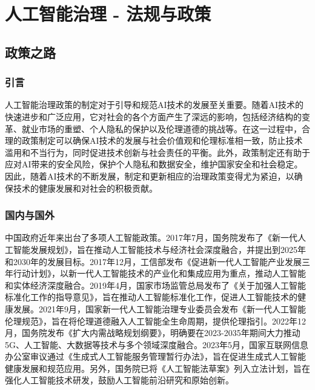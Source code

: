 \setchapterpreamble[u]{\margintoc}
\chapter[人工智能治理 - 法规与政策]{人工智能治理 - 法规与政策\footnotemark[0]}

{}

\section{政策之路}
\subsection{引言}
人工智能治理政策的制定对于引导和规范AI技术的发展至关重要。随着AI技术的快速进步和广泛应用，它对社会的各个方面产生了深远的影响，包括经济结构的变革、就业市场的重塑、个人隐私的保护以及伦理道德的挑战等。在这一过程中，合理的政策制定可以确保AI技术的发展与社会价值观和伦理标准相一致，防止技术滥用和不当行为，同时促进技术创新与社会责任的平衡。此外，政策制定还有助于应对AI带来的安全风险，保护个人隐私和数据安全，维护国家安全和社会稳定。因此，随着AI技术的不断发展，制定和更新相应的治理政策变得尤为紧迫，以确保技术的健康发展和对社会的积极贡献。

\subsection{国内与国外}
中国政府近年来出台了多项⼈⼯智能政策。2017年7⽉，国务院发布了《新⼀代⼈⼯智能发展规划》，旨在推动人工智能技术与经济社会深度融合，并提出到2025年和2030年的发展目标。2017年12月，工信部发布《促进新一代人工智能产业发展三年行动计划》，以新一代人工智能技术的产业化和集成应用为重点，推动人工智能和实体经济深度融合。2019年4⽉，国家市场监管总局发布了《关于加强⼈⼯智能标准化⼯作的指导意⻅》，旨在推动⼈⼯智能标准化⼯作，促进⼈⼯智能技术的健康发展。2021年9月，国家新一代人工智能治理专业委员会发布《新一代人工智能伦理规范》，旨在将伦理道德融入人工智能全生命周期，提供伦理指引。2022年12月，国务院发布《扩大内需战略规划纲要》，明确要在2023-2035年期间大力推动5G、人工智能、大数据等技术与多个领域深度融合。2023年5月，国家互联网信息办公室审议通过《生成式人工智能服务管理暂行办法》，旨在促进生成式人工智能健康发展和规范应用。另外，国务院已将《人工智能法草案》列入立法计划，旨在强化人工智能技术研发，鼓励人工智能前沿研究和原始创新。

